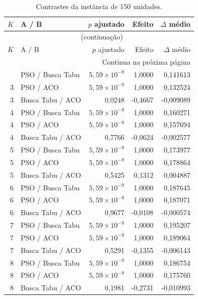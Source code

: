 \begingroup\small
\setlength{\tabcolsep}{5pt}
\begin{longtable}{rlrrr}
\caption{Contrastes da instância de 150 unidades.}\label{tab:contrastes-150}\\
\toprule
$K$ & A / B & $p$ ajustado & Efeito & $\Delta$ médio \\
\midrule
\endfirsthead
\multicolumn{5}{c}{\tablename~\thetable{} (continuação)}\\
\toprule
$K$ & A / B & $p$ ajustado & Efeito & $\Delta$ médio \\
\midrule
\endhead
\midrule\multicolumn{5}{r}{Continua na próxima página}\\
\endfoot
\bottomrule
\endlastfoot
3 & PSO / Busca Tabu & $5{,}59\times10^{-9}$ & 1,0000 & 0,141613 \\
3 & PSO / ACO & $5{,}59\times10^{-9}$ & 1,0000 & 0,132524 \\
3 & Busca Tabu / ACO & 0,0248 & -0,4667 & -0,009089 \\
4 & PSO / Busca Tabu & $5{,}59\times10^{-9}$ & 1,0000 & 0,160271 \\
4 & PSO / ACO & $5{,}59\times10^{-9}$ & 1,0000 & 0,157694 \\
4 & Busca Tabu / ACO & 0,7766 & -0,0624 & -0,002577 \\
5 & PSO / Busca Tabu & $5{,}59\times10^{-9}$ & 1,0000 & 0,173977 \\
5 & PSO / ACO & $5{,}59\times10^{-9}$ & 1,0000 & 0,178864 \\
5 & Busca Tabu / ACO & 0,5425 & 0,1312 & 0,004887 \\
6 & PSO / Busca Tabu & $5{,}59\times10^{-9}$ & 1,0000 & 0,187645 \\
6 & PSO / ACO & $5{,}59\times10^{-9}$ & 1,0000 & 0,187071 \\
6 & Busca Tabu / ACO & 0,9677 & -0,0108 & -0,000574 \\
7 & PSO / Busca Tabu & $5{,}59\times10^{-9}$ & 1,0000 & 0,195207 \\
7 & PSO / ACO & $5{,}59\times10^{-9}$ & 1,0000 & 0,189064 \\
7 & Busca Tabu / ACO & 0,5291 & -0,1355 & -0,006143 \\
8 & PSO / Busca Tabu & $5{,}59\times10^{-9}$ & 1,0000 & 0,186754 \\
8 & PSO / ACO & $5{,}59\times10^{-9}$ & 1,0000 & 0,175760 \\
8 & Busca Tabu / ACO & 0,1981 & -0,2731 & -0,010993 \\
\end{longtable}
\endgroup

